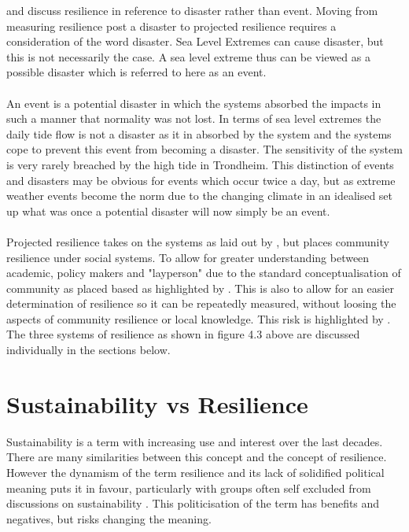 \cite{cutter_place-based_2008} and \cite{cutter_community_2020} discuss resilience in reference to disaster rather than event. Moving from measuring resilience post a disaster to projected resilience requires a consideration of the word disaster. Sea Level Extremes can cause disaster, but this is not necessarily the case. A sea level extreme thus can be viewed as a possible disaster which is referred to here as an event. 
\paragraph{}
An event is a potential disaster in which the systems absorbed the impacts in such a manner that normality was not lost. In terms of sea level extremes the daily tide flow is not a disaster as it in absorbed by the system and the systems cope to prevent this event from becoming a disaster. The sensitivity of the system is very rarely breached by the high tide in Trondheim. This distinction of events and disasters may be obvious for events which occur twice a day, but as extreme weather events become the norm due to the changing climate in an idealised set up what was once a potential disaster will now simply be an event. 
\paragraph{}

Projected resilience takes on the systems as laid out by \cite{cutter_community_2020}, but places community resilience under social systems. To allow for greater understanding between academic, policy makers and "layperson" due to the standard conceptualisation of community as placed based as highlighted by \cite{rasanen_conceptualizing_2020}. This is also to allow for an easier determination of resilience so it can be repeatedly measured, without loosing the aspects of community resilience or local knowledge. This risk is highlighted by \cite{rasanen_conceptualizing_2020}. The three systems of resilience as shown in figure 4.3 above are discussed individually in the sections below.



\section{Sustainability vs Resilience}

Sustainability is a term with increasing use and interest over the last decades. There are many similarities between this concept and the concept of resilience. However the dynamism of the term resilience and its lack of solidified political meaning puts it in favour, particularly with groups often self excluded from discussions on sustainability \cite{moser_turbulent_2019}. This politicisation of the term has benefits and negatives, but risks changing the meaning.
